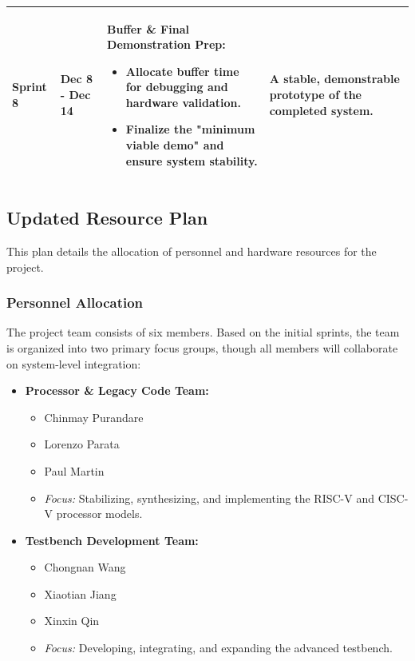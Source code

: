 \documentclass[10pt]{article}
\begin{document}
\begin{table}[h!]
\begin{tabular}{@{}llp{6cm}p{5cm}@{}}
\addlinespace
\textbf{Sprint 8} & Dec 8 - Dec 14 & \textbf{Buffer \& Final Demonstration Prep:} \newline \begin{itemize} \itemsep0em \item Allocate buffer time for debugging and hardware validation. \item Finalize the "minimum viable demo" and ensure system stability. \end{itemize} & A stable, demonstrable prototype of the completed system. \\
\bottomrule
\end{tabular}
\end{table}

\subsection{Updated Resource Plan}

This plan details the allocation of personnel and hardware resources for the project.

\subsubsection*{Personnel Allocation}
The project team consists of six members. Based on the initial sprints, the team is organized into two primary focus groups, though all members will collaborate on system-level integration:

\begin{itemize}
    \item \textbf{Processor \& Legacy Code Team:}
    \begin{itemize}
        \item Chinmay Purandare
        \item Lorenzo Parata
        \item Paul Martin
        \item \textit{Focus:} Stabilizing, synthesizing, and implementing the RISC-V and CISC-V processor models.
    \end{itemize}
    \vspace{0.5em} %
    \item \textbf{Testbench Development Team:}
    \begin{itemize}
        \item Chongnan Wang
        \item Xiaotian Jiang
        \item Xinxin Qin
        \item \textit{Focus:} Developing, integrating, and expanding the advanced testbench.
    \end{itemize}
\end{itemize}
\end{document}
